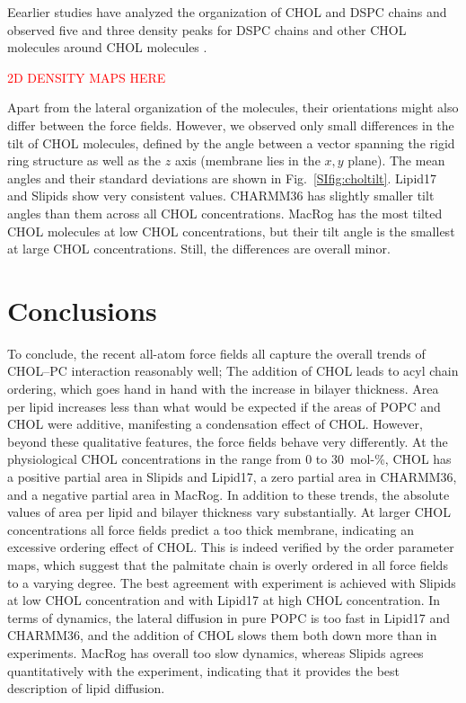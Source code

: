 \documentclass[aps,prl,superscriptaddress]{revtex4-2}
\begin{document}
Eearlier studies have analyzed the organization of CHOL and DSPC chains and observed five and three density peaks for DSPC chains and other CHOL molecules around CHOL molecules \cite{martinez2010cholesterol}. 

\textcolor{red}{2D DENSITY MAPS HERE}

Apart from the lateral organization of the molecules, their orientations might also differ between the force fields. However, we observed only small differences in the tilt of CHOL molecules, defined by the angle between a vector spanning the rigid ring structure as well as the $z$ axis (membrane lies in the $x,y$ plane). The mean angles and their standard deviations are shown in Fig.~\ref{SIfig:choltilt}. Lipid17 and Slipids show very consistent values. CHARMM36 has slightly smaller tilt angles than them across all CHOL concentrations. MacRog has the most tilted CHOL molecules at low CHOL concentrations, but their tilt angle is the smallest at large CHOL concentrations. Still, the differences are overall minor.

\section{Conclusions}

To conclude, the recent all-atom force fields all capture the overall trends of CHOL--PC interaction reasonably well; The addition of CHOL leads to acyl chain ordering, which goes hand in hand with the increase in bilayer thickness. Area per lipid increases less than what would be expected if the areas of POPC and CHOL were additive, manifesting a condensation effect of CHOL. However, beyond these qualitative features, the force fields behave very differently. At the physiological CHOL concentrations in the range from 0 to 30~mol-\%, CHOL has a positive partial area in Slipids and Lipid17, a zero partial area in CHARMM36, and a negative partial area in MacRog. In addition to these trends, the absolute values of area per lipid and bilayer thickness vary substantially. At larger CHOL concentrations all force fields predict a too thick membrane, indicating an excessive ordering effect of CHOL. This is indeed verified by the order parameter maps, which suggest that the palmitate chain is overly ordered in all force fields to a varying degree. The best agreement with experiment is achieved with Slipids at low CHOL concentration and with Lipid17 at high CHOL concentration. In terms of dynamics, the lateral diffusion in pure POPC is too fast in Lipid17 and CHARMM36, and the addition of CHOL slows them both down more than in experiments. MacRog has overall too slow dynamics, whereas Slipids agrees quantitatively with the experiment, indicating that it provides the best description of lipid diffusion.
\end{document}
